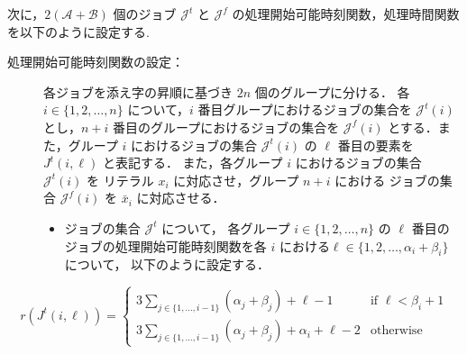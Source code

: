 \documentclass[12pt]{optlab-bachelor}
\begin{document}
次に，$2(\mathcal{A} + \mathcal{B})$ 個のジョブ $\mathcal{J}^t$ と $\mathcal{J}^f$ の処理開始可能時刻関数，処理時間関数を以下のように設定する.
\begin{description}
  \item[処理開始可能時刻関数の設定：] 各ジョブを添え字の昇順に基づき $2n$ 個のグループに分ける． 各 $i \in \{1,2,\ldots,n\}$ について，$i$ 番目グループにおけるジョブの集合を $\mathcal{J}^t(i)$ とし，$n + i$ 番目のグループにおけるジョブの集合を
  $\mathcal{J}^f(i)$ とする．また，グループ $i$ におけるジョブの集合 $\mathcal{J}^t(i)$ の $\ell$ 番目の要素を $J^t(i,\ell)$ と表記する．
  また，各グループ $i$ におけるジョブの集合 $\mathcal{J}^t(i)$ を リテラル $x_i$ に対応させ，グループ $n + i$ における ジョブの集合 $\mathcal{J}^f(i)$ を $\bar x_i$ に対応させる．
  \begin{itemize}
    \item ジョブの集合 $\mathcal{J}^t$ について， 各グループ $i \in
    \{1,2,\ldots, n\}$ の $\ell$ 番目のジョブの処理開始可能時刻関数を各
    $i$ における$\ell \in \{1,2,\ldots, \alpha_i + \beta_i\}$ について，
    以下のように設定する．
  \end{itemize}
\end{description}
\begin{displaymath}
  r(J^t(i,\ell)) =
  \left\{ \begin{array}{lll} 3\displaystyle
  \sum_{j \in \{1,\ldots,i - 1\}}(\alpha_j + \beta_j) + \ell - 1 &
  \text{if } \ell < \beta_i + 1 \\ 3 \displaystyle \sum_{j \in \{1,\ldots,i - 1\}}(\alpha_j + \beta_j) + \alpha_i + \ell - 2 & \text{otherwise} \end{array} \right.
\end{displaymath}
\end{document}
